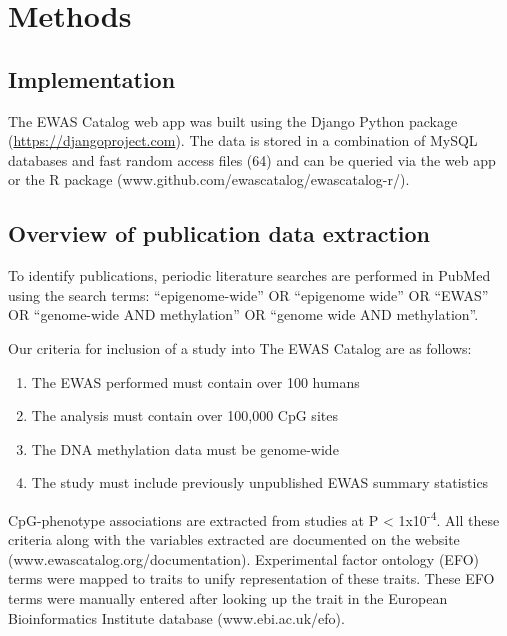 \documentclass[11pt,oneside]{bristolthesis}
\providecommand{\tightlist}{%
  \setlength{\itemsep}{0pt}\setlength{\parskip}{0pt}}
\begin{document}
\hypertarget{methods-03}{%
\section{Methods}\label{methods-03}}

\hypertarget{implementation}{%
\subsection{Implementation}\label{implementation}}

The EWAS Catalog web app was built using the Django Python package (\url{https://djangoproject.com}). The data is stored in a combination of MySQL databases and fast random access files (64) and can be queried via the web app or the R package (www.github.com/ewascatalog/ewascatalog-r/).

\hypertarget{overview-of-publication-data-extraction}{%
\subsection{Overview of publication data extraction}\label{overview-of-publication-data-extraction}}

To identify publications, periodic literature searches are performed in PubMed using the search terms: ``epigenome-wide'' OR ``epigenome wide'' OR ``EWAS'' OR ``genome-wide AND methylation'' OR ``genome wide AND methylation''.

Our criteria for inclusion of a study into The EWAS Catalog are as follows:
\begin{enumerate}
\def\labelenumi{\arabic{enumi}.}
\tightlist
\item
  The EWAS performed must contain over 100 humans
\item
  The analysis must contain over 100,000 CpG sites
\item
  The DNA methylation data must be genome-wide
\item
  The study must include previously unpublished EWAS summary statistics
\end{enumerate}
CpG-phenotype associations are extracted from studies at P \textless{} 1x10\textsuperscript{-4}. All these criteria along with the variables extracted are documented on the website (www.ewascatalog.org/documentation). Experimental factor ontology (EFO) terms were mapped to traits to unify representation of these traits. These EFO terms were manually entered after looking up the trait in the European Bioinformatics Institute database (www.ebi.ac.uk/efo).
\end{document}
